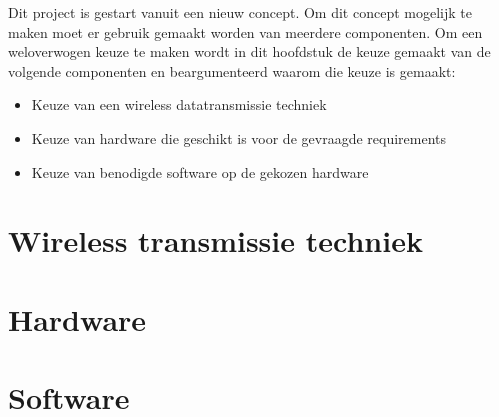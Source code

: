 \documentclass{../local}
\begin{document}
Dit project is gestart vanuit een nieuw concept. Om dit concept mogelijk te maken moet er gebruik gemaakt worden van meerdere componenten. Om een weloverwogen keuze te maken wordt in dit hoofdstuk de keuze gemaakt van de volgende componenten en beargumenteerd waarom die keuze is gemaakt:
\begin{itemize}
\item Keuze van een wireless datatransmissie techniek
\item Keuze van hardware die geschikt is voor de gevraagde requirements
\item Keuze van benodigde software op de gekozen hardware
\end{itemize}

\section{Wireless transmissie techniek}



\section{Hardware}


\section{Software}
\end{document}
